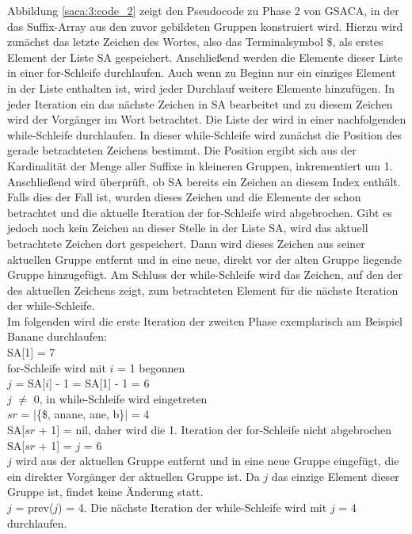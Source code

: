 Abbildung \ref{saca:3:code_2} zeigt den Pseudocode zu Phase 2 von GSACA, in der das Suffix-Array aus den zuvor gebildeten Gruppen konstruiert wird.
Hierzu wird zunächst das letzte Zeichen des Wortes, also das Terminalsymbol \$, als erstes Element der Liste SA gespeichert. 
Anschließend werden die Elemente dieser Liste in einer for-Schleife durchlaufen.
Auch wenn zu Beginn nur ein einziges Element in der Liste enthalten ist, wird jeder Durchlauf weitere Elemente hinzufügen.
In jeder Iteration ein das nächste Zeichen in SA bearbeitet und zu diesem Zeichen wird der Vorgänger im Wort betrachtet. 
Die Liste der \prevpointer wird in einer nachfolgenden while-Schleife durchlaufen.
In dieser while-Schleife wird zunächst die Position des gerade betrachteten Zeichens bestimmt. 
Die Position ergibt sich aus der Kardinalität der Menge aller Suffixe in kleineren Gruppen, inkrementiert um 1. 
Anschließend wird überprüft, ob SA bereits ein Zeichen an diesem Index enthält. 
Falls dies der Fall ist, wurden dieses Zeichen und die Elemente der \prevpointer schon betrachtet und die aktuelle Iteration der for-Schleife wird abgebrochen. 
Gibt es jedoch noch kein Zeichen an dieser Stelle in der Liste SA, wird das aktuell betrachtete Zeichen dort gespeichert. 
Dann wird dieses Zeichen aus seiner aktuellen Gruppe entfernt und in eine neue, direkt vor der alten Gruppe liegende Gruppe hinzugefügt.
Am Schluss der while-Schleife wird das Zeichen, auf den der \prevpointer des aktuellen Zeichens zeigt, zum betrachteten Element für die nächste Iteration der while-Schleife.\\

Im folgenden wird die erste Iteration der zweiten Phase exemplarisch am Beispiel Banane durchlaufen:\\
SA[1] = 7\\
for-Schleife wird mit $i$ = 1 begonnen\\
$j$ = SA[$i$] - 1 = SA[1] - 1 = 6\\
$j$ $\neq$ 0, in while-Schleife wird eingetreten\\
$sr$ = |\{\$, anane, ane, b\}| = 4\\
SA[$sr$ + 1] = nil, daher wird die 1. Iteration der for-Schleife nicht abgebrochen\\
SA[$sr$ + 1] = $j$ = 6\\
$j$ wird aus der aktuellen Gruppe entfernt und in eine neue Gruppe eingefügt, die ein direkter Vorgänger der aktuellen Gruppe ist. Da $j$ das einzige Element dieser Gruppe ist, findet keine Änderung statt.\\
$j$ = prev($j$) = 4. Die nächste Iteration der while-Schleife wird mit $j$ = 4 durchlaufen.


\clearpage %
